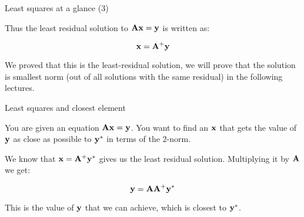 \documentclass{beamer}
\begin{document}
\begin{frame}{Least squares at a glance (3)}
	\begin{flushleft}
		
		Thus the least residual solution to $\mathbf{A}\mathbf{x} = \mathbf{y}$ is written as:
		
		\begin{equation}
			\mathbf{x} = \mathbf{A}^+\mathbf{y}
		\end{equation}
		
		We proved that this is the least-residual solution, we will prove that the solution is smallest norm (out of all solutions with the same residual) in the following lectures.
		
	\end{flushleft}
\end{frame}



\begin{frame}{Least squares and closest element}
	\begin{flushleft}
		
		You are given an equation $\mathbf{A}\mathbf{x} = \mathbf{y}$. You want to find an $\mathbf{x}$ that gets the value of $\mathbf{y}$ as close as possible to $\mathbf{y}^*$ in terms of the 2-norm.
		
		\bigskip
		
		We know that $\mathbf{x} = \mathbf{A}^+\mathbf{y}^*$ gives us the least residual solution. Multiplying it by $\mathbf{A}$ we get:
		
		\begin{equation}
			\mathbf{y} = \mathbf{A}\mathbf{A}^+\mathbf{y}^*
		\end{equation}
		
		This is the value of $\mathbf{y}$ that we can achieve, which is closest to $\mathbf{y}^*$.
		
	\end{flushleft}
\end{frame}



%
%
%
%
\end{document}
